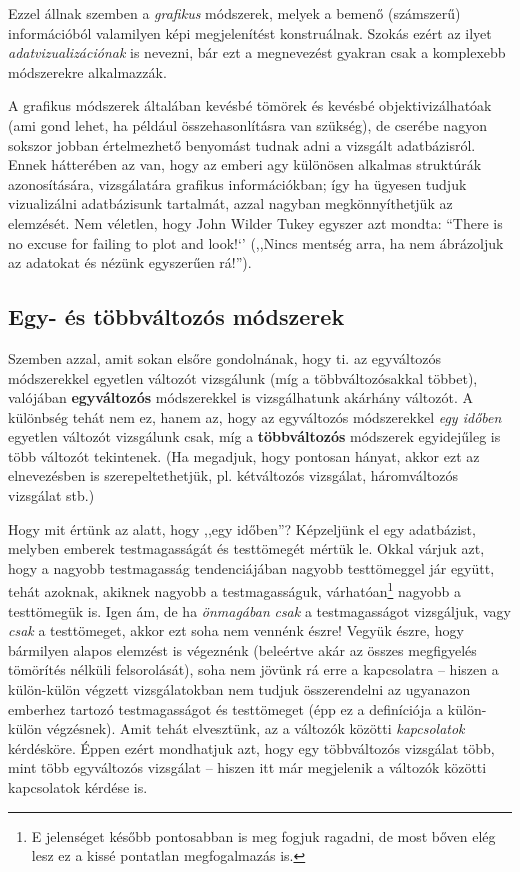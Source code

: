 \documentclass[]{book}
\let\rmarkdownfootnote\footnote%
\def\footnote{\protect\rmarkdownfootnote}
\begin{document}
Ezzel állnak szemben a \emph{grafikus} módszerek, melyek a bemenő
(számszerű) információból valamilyen képi megjelenítést konstruálnak.
Szokás ezért az ilyet \emph{adatvizualizációnak} is nevezni, bár ezt a
megnevezést gyakran csak a komplexebb módszerekre alkalmazzák.

A grafikus módszerek általában kevésbé tömörek és kevésbé
objektivizálhatóak (ami gond lehet, ha például összehasonlításra van
szükség), de cserébe nagyon sokszor jobban értelmezhető benyomást tudnak
adni a vizsgált adatbázisról. Ennek hátterében az van, hogy az emberi
agy különösen alkalmas struktúrák azonosítására, vizsgálatára grafikus
információkban; így ha ügyesen tudjuk vizualizálni adatbázisunk
tartalmát, azzal nagyban megkönnyíthetjük az elemzését. Nem véletlen,
hogy John Wilder Tukey egyszer azt mondta: ``There is no excuse for
failing to plot and look!`' (,,Nincs mentség arra, ha nem ábrázoljuk az
adatokat és nézünk egyszerűen rá!'').

\subsection{Egy- és többváltozós
módszerek}\label{deskriptivcsoportositasegytobbvalt}

Szemben azzal, amit sokan elsőre gondolnának, hogy ti. az egyváltozós
módszerekkel egyetlen változót vizsgálunk (míg a többváltozósakkal
többet), valójában \textbf{egyváltozós} módszerekkel is vizsgálhatunk
akárhány változót. A különbség tehát nem ez, hanem az, hogy az
egyváltozós módszerekkel \emph{egy időben} egyetlen változót vizsgálunk
csak, míg a \textbf{többváltozós} módszerek egyidejűleg is több változót
tekintenek. (Ha megadjuk, hogy pontosan hányat, akkor ezt az
elnevezésben is szerepeltethetjük, pl. kétváltozós vizsgálat,
háromváltozós vizsgálat stb.)

Hogy mit értünk az alatt, hogy ,,egy időben''? Képzeljünk el egy
adatbázist, melyben emberek testmagasságát és testtömegét mértük le.
Okkal várjuk azt, hogy a nagyobb testmagasság tendenciájában nagyobb
testtömeggel jár együtt, tehát azoknak, akiknek nagyobb a
testmagasságuk,
várhatóan\footnote{E jelenséget később pontosabban is meg fogjuk ragadni, de most bőven elég lesz ez a kissé pontatlan megfogalmazás is.}
nagyobb a testtömegük is. Igen ám, de ha \emph{önmagában} \emph{csak} a
testmagasságot vizsgáljuk, vagy \emph{csak} a testtömeget, akkor ezt
soha nem vennénk észre! Vegyük észre, hogy bármilyen alapos elemzést is
végeznénk (beleértve akár az összes megfigyelés tömörítés nélküli
felsorolását), soha nem jövünk rá erre a kapcsolatra -- hiszen a
külön-külön végzett vizsgálatokban nem tudjuk összerendelni az ugyanazon
emberhez tartozó testmagasságot és testtömeget (épp ez a definíciója a
külön-külön végzésnek). Amit tehát elvesztünk, az a változók közötti
\emph{kapcsolatok} kérdésköre. Éppen ezért mondhatjuk azt, hogy egy
többváltozós vizsgálat több, mint több egyváltozós vizsgálat -- hiszen
itt már megjelenik a változók közötti kapcsolatok kérdése is.
\end{document}
